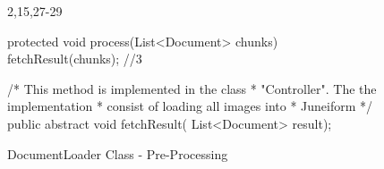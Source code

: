 \begin{figure}[H]
\begin{minipage}{0.48\textwidth}
\begin{sourcecode}
\begin{javacode}{2,15,27-29}
{    protected void process(List<Document> chunks){
        fetchResult(chunks); //3$\label{codeline:DocumentLoader-3b}$
    }

	/* This method is implemented in the class 
	 * "Controller". The the implementation 
	 * consist of loading all images into 
	 * Juneiform
	*/
    public abstract void fetchResult(
    	List<Document> result);
}
\end{javacode}
\caption{DocumentLoader Class - Pre-Processing}
\label{code:example-pre-processing}
\end{sourcecode}
\end{minipage}
\end{figure}